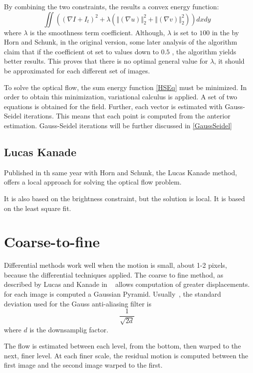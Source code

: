 \documentclass[12pt,a4paper,twoside]{report}
\begin{document}
By combining the two constraints, the results a convex energy function:
\begin{equation} \label{HSEq}
	\iint  ((\nabla I + I_t)^2 + \lambda(\left\Vert(\nabla u) \right\Vert_2^2 +\left\Vert(\nabla v) \right\Vert_2^2))dxdy
\end{equation}
where $\lambda$ is the smoothness term coefficient. Although, $\lambda$ is set to $100$ in the by Horn and Schunk, in the original version, some later analysis of the algorithm claim that if the coefficient ot set to values down to $0.5$ \cite{barron1994}, the algorithm yields better results. This proves that there is no optimal general value for $\lambda$, it should be approximated for each different set of images.

To solve the optical flow, the sum energy function \ref{HSEq} must be minimized. In order to obtain this minimization, variational calculus is applied. A set of two equations is obtained for the field.
Further, each vector is estimated with Gauss-Seidel iterations. This means that each point is computed from the anterior estimation. Gauss-Seidel iterations will be further discussed in \ref{GaussSeidel}


\subsection{Lucas Kanade}

Published in th same year with Horn and Schunk, the Lucas Kanade method, offers a local approach for solving the optical flow problem. 

It is also based on the brightness constraint, but the solution is local.
It is based on the least square fit.

\section{Coarse-to-fine}
Differential methods work well when the motion is small, about 1-2 pixels, because the differential techniques applied.
The coarse to fine method, as described by Lucas and Kanade in ~\cite{lucas1981} allows computation of greater displacements. for each image is computed a Gaussian Pyramid. Usually~\cite{sun2010}, the standard deviation used for the Gauss anti-aliasing filter is 
\begin{equation}
	\frac{1}{\sqrt{2d}}
\end{equation} where $d$ is the downsamplig factor.

The flow is estimated between each level, from the bottom, then warped to the next, finer level. At each finer scale, the residual motion is computed between the first image and the second image warped to the first. 
\end{document}
